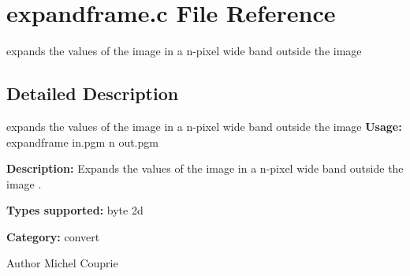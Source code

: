 \section{expandframe.c File Reference}
\label{expandframe_8c}


expands the values of the image in a n-\/pixel wide band outside the image  




\subsection{Detailed Description}
expands the values of the image in a n-\/pixel wide band outside the image {\bfseries Usage:} expandframe in.pgm n out.pgm

{\bfseries Description:} Expands the values of the image in a n-\/pixel wide band outside the image .

{\bfseries Types supported:} byte 2d

{\bfseries Category:} convert

\begin{DoxyAuthor}{Author}
Michel Couprie 
\end{DoxyAuthor}
